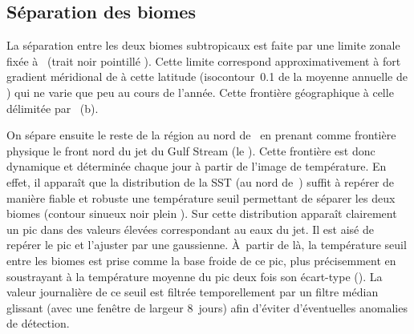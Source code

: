 \subsection{Séparation des biomes}

La séparation entre les deux biomes subtropicaux est faite par une limite zonale fixée à~ (trait noir pointillé ).
Cette limite correspond approximativement à fort gradient méridional de  à cette latitude (isocontour~\qty{0.1}{\mgm} de la moyenne annuelle de ) qui ne varie que peu au cours de l'année.
Cette frontière géographique à celle délimitée par \textcite{sarmiento_2004}~(b).

\begin{figure}
  \centering
  \label{fig:regions}
\end{figure}

On sépare ensuite le reste de la région au nord de~ en prenant comme frontière physique le front nord du jet du Gulf Stream (le ).
Cette frontière est donc dynamique et déterminée chaque jour à partir de l'image de température.
En effet, il apparaît que la distribution de la SST (au nord de~) suffit à repérer de manière fiable et robuste une température seuil permettant de séparer les deux biomes (contour sinueux noir plein ).
Sur cette distribution apparaît clairement un pic dans des valeurs élevées correspondant au eaux du jet.
Il est aisé de repérer le pic et l'ajuster par une gaussienne.
À~partir de là, la température seuil entre les biomes est prise comme la base froide de ce pic,  plus précisemment en soustrayant à la température moyenne du pic deux fois son écart-type ().
La valeur journalière de ce seuil est filtrée temporellement par un filtre médian glissant (avec une fenêtre de largeur 8~jours) afin d'éviter d'éventuelles anomalies de détection.

